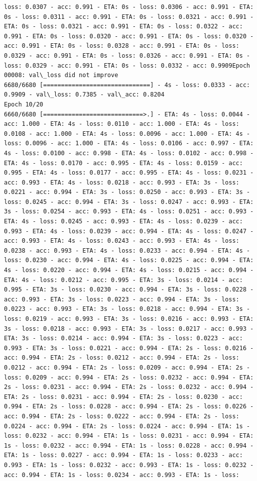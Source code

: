 \documentclass[11pt]{article}
\begin{document}
\begin{Verbatim}[commandchars=\\\{\}]
loss: 0.0307 - acc: 0.991 - ETA: 0s - loss: 0.0306 - acc: 0.991 - ETA: 0s - loss: 0.0311 - acc: 0.991 - ETA: 0s - loss: 0.0321 - acc: 0.991 - ETA: 0s - loss: 0.0321 - acc: 0.991 - ETA: 0s - loss: 0.0322 - acc: 0.991 - ETA: 0s - loss: 0.0320 - acc: 0.991 - ETA: 0s - loss: 0.0320 - acc: 0.991 - ETA: 0s - loss: 0.0328 - acc: 0.991 - ETA: 0s - loss: 0.0329 - acc: 0.991 - ETA: 0s - loss: 0.0326 - acc: 0.991 - ETA: 0s - loss: 0.0329 - acc: 0.991 - ETA: 0s - loss: 0.0332 - acc: 0.9909Epoch 00008: val\_loss did not improve
6680/6680 [==============================] - 4s - loss: 0.0333 - acc: 0.9909 - val\_loss: 0.7385 - val\_acc: 0.8204
Epoch 10/20
6660/6680 [============================>.] - ETA: 4s - loss: 0.0044 - acc: 1.000 - ETA: 4s - loss: 0.0110 - acc: 1.000 - ETA: 4s - loss: 0.0108 - acc: 1.000 - ETA: 4s - loss: 0.0096 - acc: 1.000 - ETA: 4s - loss: 0.0096 - acc: 1.000 - ETA: 4s - loss: 0.0106 - acc: 0.997 - ETA: 4s - loss: 0.0100 - acc: 0.998 - ETA: 4s - loss: 0.0102 - acc: 0.998 - ETA: 4s - loss: 0.0170 - acc: 0.995 - ETA: 4s - loss: 0.0159 - acc: 0.995 - ETA: 4s - loss: 0.0177 - acc: 0.995 - ETA: 4s - loss: 0.0231 - acc: 0.993 - ETA: 4s - loss: 0.0218 - acc: 0.993 - ETA: 3s - loss: 0.0221 - acc: 0.994 - ETA: 3s - loss: 0.0250 - acc: 0.993 - ETA: 3s - loss: 0.0245 - acc: 0.994 - ETA: 3s - loss: 0.0247 - acc: 0.993 - ETA: 3s - loss: 0.0254 - acc: 0.993 - ETA: 4s - loss: 0.0251 - acc: 0.993 - ETA: 4s - loss: 0.0245 - acc: 0.993 - ETA: 4s - loss: 0.0239 - acc: 0.993 - ETA: 4s - loss: 0.0239 - acc: 0.994 - ETA: 4s - loss: 0.0247 - acc: 0.993 - ETA: 4s - loss: 0.0243 - acc: 0.993 - ETA: 4s - loss: 0.0238 - acc: 0.993 - ETA: 4s - loss: 0.0233 - acc: 0.994 - ETA: 4s - loss: 0.0230 - acc: 0.994 - ETA: 4s - loss: 0.0225 - acc: 0.994 - ETA: 4s - loss: 0.0220 - acc: 0.994 - ETA: 4s - loss: 0.0215 - acc: 0.994 - ETA: 4s - loss: 0.0212 - acc: 0.995 - ETA: 3s - loss: 0.0214 - acc: 0.995 - ETA: 3s - loss: 0.0230 - acc: 0.994 - ETA: 3s - loss: 0.0228 - acc: 0.993 - ETA: 3s - loss: 0.0223 - acc: 0.994 - ETA: 3s - loss: 0.0223 - acc: 0.993 - ETA: 3s - loss: 0.0218 - acc: 0.994 - ETA: 3s - loss: 0.0219 - acc: 0.993 - ETA: 3s - loss: 0.0216 - acc: 0.993 - ETA: 3s - loss: 0.0218 - acc: 0.993 - ETA: 3s - loss: 0.0217 - acc: 0.993 - ETA: 3s - loss: 0.0214 - acc: 0.994 - ETA: 3s - loss: 0.0223 - acc: 0.993 - ETA: 3s - loss: 0.0221 - acc: 0.994 - ETA: 2s - loss: 0.0216 - acc: 0.994 - ETA: 2s - loss: 0.0212 - acc: 0.994 - ETA: 2s - loss: 0.0212 - acc: 0.994 - ETA: 2s - loss: 0.0209 - acc: 0.994 - ETA: 2s - loss: 0.0209 - acc: 0.994 - ETA: 2s - loss: 0.0232 - acc: 0.994 - ETA: 2s - loss: 0.0231 - acc: 0.994 - ETA: 2s - loss: 0.0232 - acc: 0.994 - ETA: 2s - loss: 0.0231 - acc: 0.994 - ETA: 2s - loss: 0.0230 - acc: 0.994 - ETA: 2s - loss: 0.0228 - acc: 0.994 - ETA: 2s - loss: 0.0226 - acc: 0.994 - ETA: 2s - loss: 0.0222 - acc: 0.994 - ETA: 2s - loss: 0.0224 - acc: 0.994 - ETA: 2s - loss: 0.0224 - acc: 0.994 - ETA: 1s - loss: 0.0232 - acc: 0.994 - ETA: 1s - loss: 0.0231 - acc: 0.994 - ETA: 1s - loss: 0.0232 - acc: 0.994 - ETA: 1s - loss: 0.0228 - acc: 0.994 - ETA: 1s - loss: 0.0227 - acc: 0.994 - ETA: 1s - loss: 0.0233 - acc: 0.993 - ETA: 1s - loss: 0.0232 - acc: 0.993 - ETA: 1s - loss: 0.0232 - acc: 0.994 - ETA: 1s - loss: 0.0234 - acc: 0.993 - ETA: 1s - loss: 
\end{Verbatim}
\end{document}
